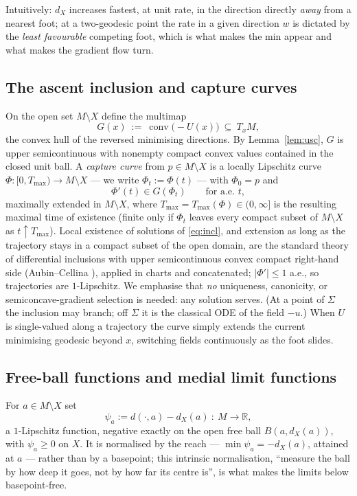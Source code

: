 \documentclass[11pt]{article}
\theoremstyle{remark}
\newcommand{\R}{\mathbb{R}}
\newcommand{\X}{X}
\newcommand{\dX}{d_{\X}}
\newcommand{\conv}{\operatorname{conv}}
\begin{document}
Intuitively: $\dX$ increases fastest, at unit rate, in the direction
directly \emph{away} from a nearest foot; at a two-geodesic point the
rate in a given direction $w$ is dictated by the \emph{least
favourable} competing foot, which is what makes the min appear and
what makes the gradient flow turn.


\subsection{The ascent inclusion and capture curves}

On the open set $M\setminus\X$ define the multimap
\[
  G(x)\ :=\ \conv\bigl(-U(x)\bigr)\ \subseteq\ T_{x}M ,
\]
the convex hull of the reversed minimising directions. By
Lemma~\ref{lem:usc}, $G$ is upper semicontinuous with nonempty
compact convex values contained in the closed unit ball. A
\emph{capture curve} from $p\in M\setminus\X$ is a locally Lipschitz
curve $\Phi:[0,T_{\max})\to M\setminus\X$ --- we write
$\Phi_{t}:=\Phi(t)$ --- with $\Phi_{0}=p$ and
\begin{equation}\label{eq:incl}
  \Phi'(t)\in G(\Phi_{t})\qquad\text{for a.e.\ }t ,
\end{equation}
maximally extended in $M\setminus\X$, where $T_{\max}=T_{\max}(\Phi)
\in(0,\infty]$ is the resulting maximal time of existence (finite only
if $\Phi_{t}$ leaves every compact subset of $M\setminus\X$ as
$t\uparrow T_{\max}$). Local existence of solutions of
\eqref{eq:incl}, and extension as long as the trajectory stays in a
compact subset of the open domain, are the standard theory of
differential inclusions with upper semicontinuous convex compact
right-hand side (Aubin--Cellina \cite[\S2.1]{AC}), applied in charts
and concatenated; $|\Phi'|\le1$ a.e., so trajectories are
$1$-Lipschitz. We emphasise that \emph{no} uniqueness, canonicity, or
semiconcave-gradient selection is needed: any solution serves. (At a
point of $\Sigma$ the inclusion may branch; off $\Sigma$ it is the
classical ODE of the field $-u$.) When $U$ is single-valued along a
trajectory the curve simply extends the current minimising geodesic
beyond $x$, switching fields continuously as the foot slides.

\subsection{Free-ball functions and medial limit functions}

For $a\in M\setminus\X$ set
\[
  \psi_{a}:=d(\cdot,a)-\dX(a)\ :\ M\to\R ,
\]
a $1$-Lipschitz function, negative exactly on the open free ball
$B(a,\dX(a))$, with $\psi_{a}\ge0$ on $\X$. It is normalised by the
reach --- $\min\psi_{a}=-\dX(a)$, attained at $a$ --- rather than by
a basepoint; this intrinsic normalisation, ``measure the ball by how
deep it goes, not by how far its centre is'', is what makes the
limits below basepoint-free.
\end{document}
